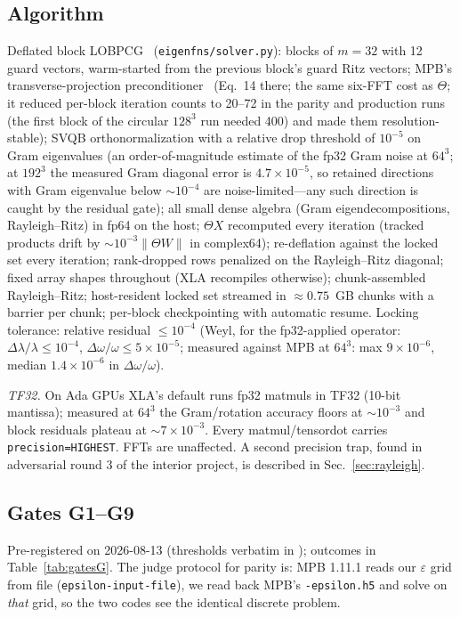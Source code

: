 \documentclass[aps,prl,preprint,superscriptaddress,longbibliography,nofootinbib]{revtex4-2}
\begin{document}
\subsection{Algorithm}
Deflated block LOBPCG~\cite{Knyazev2001,Duersch2018} (\texttt{eigenfns/solver.py}): blocks of $m=32$ with 12 guard vectors, warm-started from the previous block's guard Ritz vectors; MPB's transverse-projection preconditioner~\cite{Johnson2001} (Eq.~14 there; the same six-FFT cost as $\Theta$; it reduced per-block iteration counts to 20--72 in the parity and production runs (the first block of the circular $128^3$ run needed 400) and made them resolution-stable); SVQB orthonormalization with a relative drop threshold of $10^{-5}$ on Gram eigenvalues (an order-of-magnitude estimate of the fp32 Gram noise at $64^3$; at $192^3$ the measured Gram diagonal error is $4.7\times10^{-5}$, so retained directions with Gram eigenvalue below $\sim10^{-4}$ are noise-limited---any such direction is caught by the residual gate); all small dense algebra (Gram eigendecompositions, Rayleigh--Ritz) in fp64 on the host; $\Theta X$ recomputed every iteration (tracked products drift by $\sim10^{-3}\|\Theta W\|$ in complex64); re-deflation against the locked set every iteration; rank-dropped rows penalized on the Rayleigh--Ritz diagonal; fixed array shapes throughout (XLA recompiles otherwise); chunk-assembled Rayleigh--Ritz; host-resident locked set streamed in $\approx0.75$~GB chunks with a barrier per chunk; per-block checkpointing with automatic resume. Locking tolerance: relative residual $\le10^{-4}$ (Weyl, for the fp32-applied operator: $\Delta\lambda/\lambda\le10^{-4}$, $\Delta\omega/\omega\le5\times10^{-5}$; measured against MPB at $64^3$: max $9\times10^{-6}$, median $1.4\times10^{-6}$ in $\Delta\omega/\omega$).

\emph{TF32.} On Ada GPUs XLA's default runs fp32 matmuls in TF32 (10-bit mantissa); measured at $64^3$ the Gram/rotation accuracy floors at $\sim10^{-3}$ and block residuals plateau at $\sim7\times10^{-3}$. Every matmul/tensordot carries \texttt{precision=HIGHEST}. FFTs are unaffected. A second precision trap, found in adversarial round 3 of the interior project, is described in Sec.~\ref{sec:rayleigh}.

\subsection{Gates G1--G9}
Pre-registered on 2026-08-13 (thresholds verbatim in ); outcomes in Table~\ref{tab:gatesG}. The judge protocol for parity is: MPB 1.11.1 reads our $\varepsilon$ grid from file (\texttt{epsilon-input-file}), we read back MPB's \texttt{-epsilon.h5} and solve on \emph{that} grid, so the two codes see the identical discrete problem.
\end{document}
